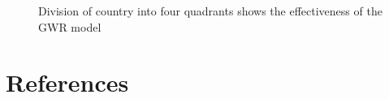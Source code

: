 \documentclass[
]{article}
\begin{document}
\begin{figure}


\caption{\label{fig-A1}Division of country into four quadrants shows the
effectiveness of the GWR model}

\end{figure}%

\newpage{}

\section*{References}\label{references}
\end{document}
